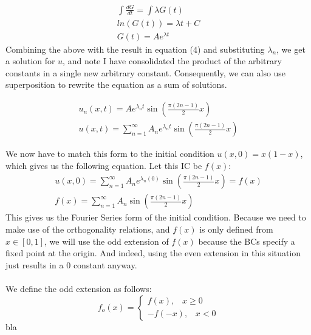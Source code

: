 \documentclass{article}
\begin{document}
\begin{equation}
\begin{aligned}
\int \frac{dG}{dt} = \int \lambda G(t)\\
ln(G(t)) = \lambda t + C\\
G(t) = Ae^{\lambda t}
\end{aligned}
\end{equation}
Combining the above with the result in equation (4) and substituting $\lambda_n$, we get a solution for $u$, and note I have consolidated the product of the arbitrary constants in a single new arbitrary constant. Consequently, we can also use superposition to rewrite the equation as a sum of solutions.
\begin{tcolorbox}[minipage,colback=white,arc=0pt,outer arc=0pt]
\begin{equation}
\begin{aligned}
u_n(x, t) = Ae^{\lambda_n t}\sin(\frac{\pi(2n-1)}{2}x)\\
u(x, t) = \sum_{n=1}^{\infty} A_ne^{\lambda_n t}\sin(\frac{\pi(2n-1)}{2}x)
\end{aligned}
\end{equation}
\end{tcolorbox}
We now have to match this form to the initial condition $u(x, 0) = x(1-x)$, which gives us the following equation. Let this IC be $f(x)$:
\begin{equation}
\begin{aligned}
u(x, 0) = \sum_{n=1}^{\infty} A_ne^{\lambda_n (0)}\sin(\frac{\pi(2n-1)}{2}x) = f(x)\\ 
f(x) = \sum_{n=1}^{\infty} A_n\sin(\frac{\pi(2n-1)}{2}x)
\end{aligned}
\end{equation}
This gives us the Fourier Series form of the initial condition. Because we need to make use of the orthogonality relations, and $f(x)$ is only defined from $x \in [0, 1]$, we will use the odd extension of $f(x)$ because the BCs specify a fixed point at the origin. And indeed, using the even extension in this situation just results in a $0$ constant anyway.\\
\\
We define the odd extension as follows:
\[f_o(x)=
  \begin{cases}
			f(x), \; \; \; x \geq 0 \\
			-f(-x), \; \; \; x < 0
            \end{cases}
\]
bla
\end{document}
